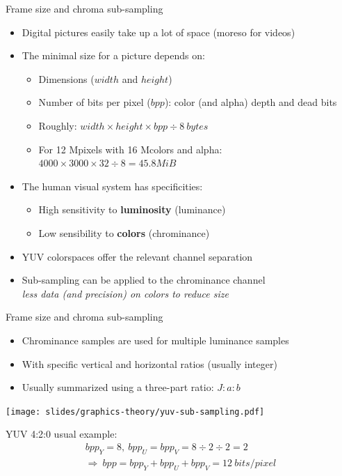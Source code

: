 \begin{frame}{Frame size and chroma sub-sampling}
  \begin{itemize}
  \item Digital pictures easily take up a lot of space (moreso for videos)
  \item The minimal size for a picture depends on:
    \begin{itemize}
    \item Dimensions (\(width\) and \(height\))
    \item Number of bits per pixel (\(bpp\)): color (and alpha) depth and dead bits
    \item Roughly: \(width \times height \times bpp \div 8~bytes\)
    \item For 12 Mpixels with 16 Mcolors and alpha: \(4000 \times 3000 \times 32 \div 8 = 45.8 MiB\)
    \end{itemize}
  \item The human visual system has specificities:
    \begin{itemize}
    \item High sensitivity to \textbf{luminosity} (luminance)
    \item Low sensibility to \textbf{colors} (chrominance)
    \end{itemize}
  \item YUV colorspaces offer the relevant channel separation
  \item Sub-sampling can be applied to the chrominance channel\\
  \textit{less data (and precision) on colors to reduce size}
  \end{itemize}
\end{frame}

\begin{frame}{Frame size and chroma sub-sampling}
  \begin{itemize}
  \item Chrominance samples are used for multiple luminance samples
  \item With specific vertical and horizontal ratios (usually integer)
  \item Usually summarized using a three-part ratio: \(J:a:b\)
  \end{itemize}

  \begin{center}
  \texttt{[image: slides/graphics-theory/yuv-sub-sampling.pdf]}

  YUV 4:2:0 usual example:
  {\small
  \begin{equation*}
  \begin{gathered}
  bpp_Y = 8,~bpp_U = bpp_V = 8 \div 2 \div 2 = 2 \\
  \Rightarrow~ bpp = bpp_Y + bpp_U + bpp_V = 12~bits/pixel
  \end{gathered}
  \end{equation*}
  }
  \end{center}
\end{frame}

